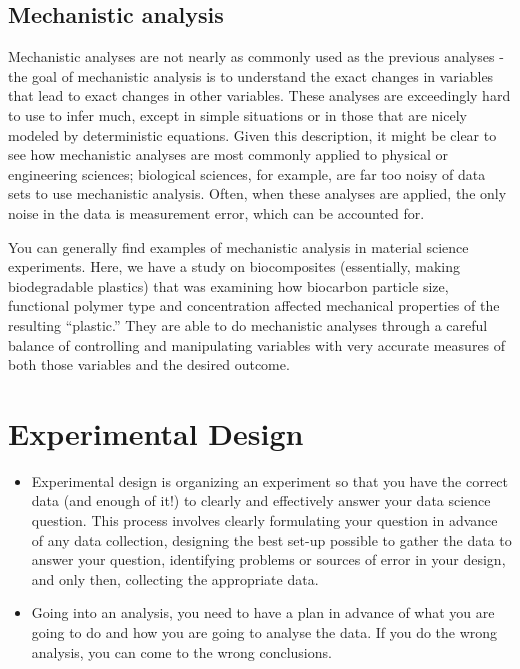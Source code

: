 \documentclass[11pt,fancy]{elegantbook}
\begin{document}
\subsection{Mechanistic analysis}
Mechanistic analyses are not nearly as commonly used as the previous analyses - the goal of mechanistic analysis is to understand the exact changes in variables that lead to exact changes in other variables. These analyses are exceedingly hard to use to infer much, except in simple situations or in those that are nicely modeled by deterministic equations. Given this description, it might be clear to see how mechanistic analyses are most commonly applied to physical or engineering sciences; biological sciences, for example, are far too noisy of data sets to use mechanistic analysis. Often, when these analyses are applied, the only noise in the data is measurement error, which can be accounted for.
\par You can generally find examples of mechanistic analysis in material science experiments. Here, we have a study on biocomposites (essentially, making biodegradable plastics) that was examining how biocarbon particle size, functional polymer type and concentration affected mechanical properties of the resulting “plastic.” They are able to do mechanistic analyses through a careful balance of controlling and manipulating variables with very accurate measures of both those variables and the desired outcome.

\section{Experimental Design}
\begin{itemize}
    \item Experimental design is organizing an experiment so that you have the correct data (and enough of it!) to clearly and effectively answer your data science question. This process involves clearly formulating your question in advance of any data collection, designing the best set-up possible to gather the data to answer your question, identifying problems or sources of error in your design, and only then, collecting the appropriate data.
    \item Going into an analysis, you need to have a plan in advance of what you are going to do and how you are going to analyse the data. If you do the wrong analysis, you can come to the wrong conclusions.
\end{itemize}
\end{document}
